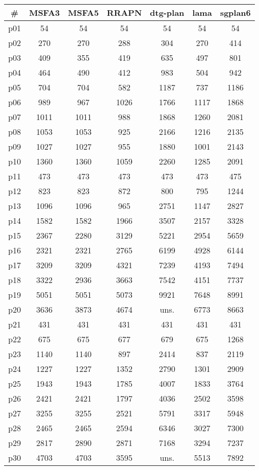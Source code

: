 \begin{tabular}{c||c|c|c|c|c|c}
\textbf{\#} & \textbf{MSFA3} & \textbf{MSFA5} & \textbf{RRAPN} & \textbf{dtg-plan} & \textbf{lama} & \textbf{sgplan6}\\
\hline
\hline
p01 & 54 & 54 & 54 & 54 & 54 & 54\\
p02 & 270 & 270 & 288 & 304 & 270 & 414\\
p03 & 409 & 355 & 419 & 635 & 497 & 801\\
p04 & 464 & 490 & 412 & 983 & 504 & 942\\
p05 & 704 & 704 & 582 & 1187 & 737 & 1186\\
p06 & 989 & 967 & 1026 & 1766 & 1117 & 1868\\
p07 & 1011 & 1011 & 988 & 1868 & 1260 & 2081\\
p08 & 1053 & 1053 & 925 & 2166 & 1216 & 2135\\
p09 & 1027 & 1027 & 955 & 1880 & 1001 & 2143\\
p10 & 1360 & 1360 & 1059 & 2260 & 1285 & 2091\\
p11 & 473 & 473 & 473 & 473 & 473 & 475\\
p12 & 823 & 823 & 872 & 800 & 795 & 1244\\
p13 & 1096 & 1096 & 965 & 2751 & 1147 & 2827\\
p14 & 1582 & 1582 & 1966 & 3507 & 2157 & 3328\\
p15 & 2367 & 2280 & 3129 & 5221 & 2954 & 5659\\
p16 & 2321 & 2321 & 2765 & 6199 & 4928 & 6144\\
p17 & 3209 & 3209 & 4321 & 7239 & 4193 & 7494\\
p18 & 3322 & 2936 & 3663 & 7542 & 4151 & 7737\\
p19 & 5051 & 5051 & 5073 & 9921 & 7648 & 8991\\
p20 & 3636 & 3873 & 4674 & uns. & 6773 & 8663\\
p21 & 431 & 431 & 431 & 431 & 431 & 431\\
p22 & 675 & 675 & 677 & 679 & 675 & 1268\\
p23 & 1140 & 1140 & 897 & 2414 & 837 & 2119\\
p24 & 1227 & 1227 & 1352 & 2790 & 1301 & 2909\\
p25 & 1943 & 1943 & 1785 & 4007 & 1833 & 3764\\
p26 & 2421 & 2421 & 1797 & 4036 & 2502 & 3598\\
p27 & 3255 & 3255 & 2521 & 5791 & 3317 & 5948\\
p28 & 2465 & 2465 & 2594 & 6346 & 3027 & 7300\\
p29 & 2817 & 2890 & 2871 & 7168 & 3294 & 7237\\
p30 & 4703 & 4703 & 3595 & uns. & 5513 & 7892\\
\end{tabular}

